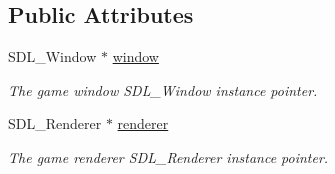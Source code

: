 \subsection*{Public Attributes}
\begin{DoxyCompactItemize}
\item 
S\-D\-L\-\_\-\-Window $\ast$ \hyperlink{class_graphics_af397f61e26b41302b0b66ee4ab408952}{window}
\begin{DoxyCompactList}\small\item\em The game window S\-D\-L\-\_\-\-Window instance pointer. \end{DoxyCompactList}\item 
S\-D\-L\-\_\-\-Renderer $\ast$ \hyperlink{class_graphics_afee9119ae93eafc5707a9e868b539a2e}{renderer}
\begin{DoxyCompactList}\small\item\em The game renderer S\-D\-L\-\_\-\-Renderer instance pointer. \end{DoxyCompactList}\end{DoxyCompactItemize}

